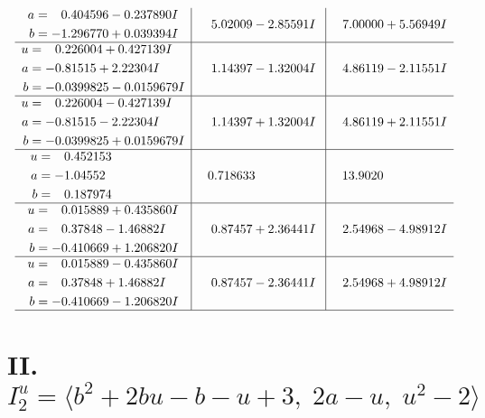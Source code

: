 \documentclass[1p]{elsarticle_modified}
\theoremstyle{definition}
\begin{document}
$$\begin{array}{c|c|c}
\begin{aligned}
a &= \phantom{-}0.404596 - 0.237890 I \\
b &= -1.296770 + 0.039394 I\end{aligned}
 & \phantom{-}5.02009 - 2.85591 I & \phantom{-}7.00000 + 5.56949 I \\ \hline\begin{aligned}
u &= \phantom{-}0.226004 + 0.427139 I \\
a &= -0.81515 + 2.22304 I \\
b &= -0.0399825 - 0.0159679 I\end{aligned}
 & \phantom{-}1.14397 - 1.32004 I & \phantom{-}4.86119 - 2.11551 I \\ \hline\begin{aligned}
u &= \phantom{-}0.226004 - 0.427139 I \\
a &= -0.81515 - 2.22304 I \\
b &= -0.0399825 + 0.0159679 I\end{aligned}
 & \phantom{-}1.14397 + 1.32004 I & \phantom{-}4.86119 + 2.11551 I \\ \hline\begin{aligned}
u &= \phantom{-}0.452153\phantom{ +0.000000I} \\
a &= -1.04552\phantom{ +0.000000I} \\
b &= \phantom{-}0.187974\phantom{ +0.000000I}\end{aligned}
 & \phantom{-}0.718633\phantom{ +0.000000I} & \phantom{-}13.9020\phantom{ +0.000000I} \\ \hline\begin{aligned}
u &= \phantom{-}0.015889 + 0.435860 I \\
a &= \phantom{-}0.37848 - 1.46882 I \\
b &= -0.410669 + 1.206820 I\end{aligned}
 & \phantom{-}0.87457 + 2.36441 I & \phantom{-}2.54968 - 4.98912 I \\ \hline\begin{aligned}
u &= \phantom{-}0.015889 - 0.435860 I \\
a &= \phantom{-}0.37848 + 1.46882 I \\
b &= -0.410669 - 1.206820 I\end{aligned}
 & \phantom{-}0.87457 - 2.36441 I & \phantom{-}2.54968 + 4.98912 I\\
 \hline 
 \end{array}$$\newpage\newpage\renewcommand{\arraystretch}{1}
\centering \section*{II. $I^u_{2}= \langle b^2+2 b u- b- u+3,\;2 a- u,\;u^2-2 \rangle$}
\end{document}

